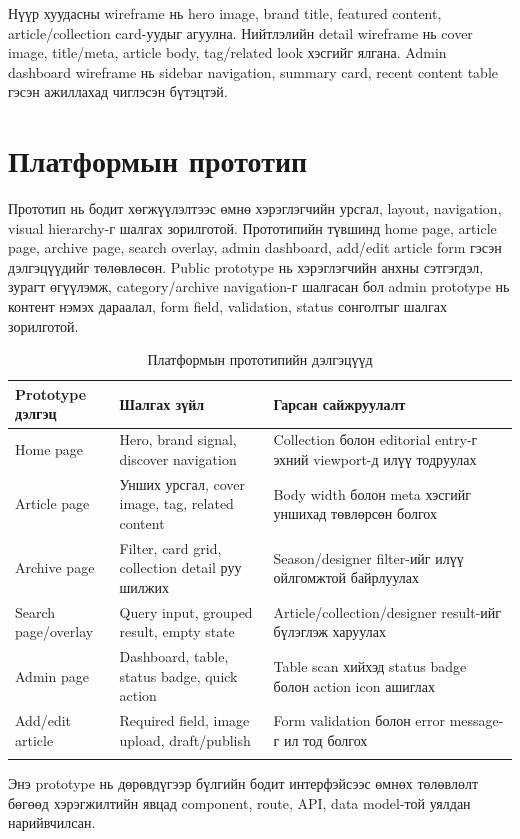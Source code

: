 Нүүр хуудасны wireframe нь hero image, brand title, featured content, article/collection card-уудыг агуулна. Нийтлэлийн detail wireframe нь cover image, title/meta, article body, tag/related look хэсгийг ялгана. Admin dashboard wireframe нь sidebar navigation, summary card, recent content table гэсэн ажиллахад чиглэсэн бүтэцтэй.

\section{Платформын прототип}
Прототип нь бодит хөгжүүлэлтээс өмнө хэрэглэгчийн урсгал, layout, navigation, visual hierarchy-г шалгах зорилготой. Прототипийн түвшинд home page, article page, archive page, search overlay, admin dashboard, add/edit article form гэсэн дэлгэцүүдийг төлөвлөсөн. Public prototype нь хэрэглэгчийн анхны сэтгэгдэл, зурагт өгүүлэмж, category/archive navigation-г шалгасан бол admin prototype нь контент нэмэх дараалал, form field, validation, status сонголтыг шалгах зорилготой.

\begin{longtable}{|L{0.22\textwidth}|L{0.34\textwidth}|L{0.30\textwidth}|}
  \hline
  \textbf{Prototype дэлгэц} & \textbf{Шалгах зүйл} & \textbf{Гарсан сайжруулалт} \\ \hline
  Home page & Hero, brand signal, discover navigation & Collection болон editorial entry-г эхний viewport-д илүү тодруулах \\ \hline
  Article page & Унших урсгал, cover image, tag, related content & Body width болон meta хэсгийг уншихад төвлөрсөн болгох \\ \hline
  Archive page & Filter, card grid, collection detail руу шилжих & Season/designer filter-ийг илүү ойлгомжтой байрлуулах \\ \hline
  Search page/overlay & Query input, grouped result, empty state & Article/collection/designer result-ийг бүлэглэж харуулах \\ \hline
  Admin page & Dashboard, table, status badge, quick action & Table scan хийхэд status badge болон action icon ашиглах \\ \hline
  Add/edit article & Required field, image upload, draft/publish & Form validation болон error message-г ил тод болгох \\ \hline
  \caption{Платформын прототипийн дэлгэцүүд}
  \label{tab:ch3-prototype-screens}\\
\end{longtable}

Энэ prototype нь дөрөвдүгээр бүлгийн бодит интерфэйсээс өмнөх төлөвлөлт бөгөөд хэрэгжилтийн явцад component, route, API, data model-той уялдан нарийвчилсан.

